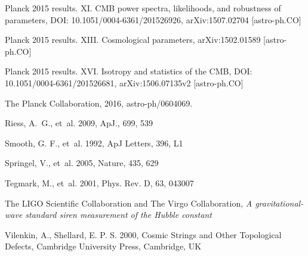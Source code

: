 \documentclass{rmaa}
\begin{document}
\begin{thebibliography}
Planck 2015 results. XI. CMB power spectra, likelihoods, and robustness of parameters,  	DOI: 10.1051/0004-6361/201526926, arXiv:1507.02704 [astro-ph.CO] 

Planck 2015 results. XIII. Cosmological parameters,  	arXiv:1502.01589 [astro-ph.CO]

 Planck 2015 results. XVI. Isotropy and statistics of the CMB, DOI:  	10.1051/0004-6361/201526681,  arXiv:1506.07135v2 [astro-ph.CO]
 
The Planck Collaboration, 2016, astro-ph/0604069. 
 
 Riess, A.~G., et~al. 2009, ApJ., 699, 539 

Smooth, G. F., et~al. 1992, ApJ Letters, 396, L1 
  
 Springel, V., et~al.  2005, Nature, 435, 629  

Tegmark, M., et~al. 2001, Phys. Rev. D, 63, 043007   

The LIGO Scientific Collaboration and The Virgo Collaboration, \textit{A gravitational-wave standard siren measurement of the Hubble constant}
 
 Vilenkin, A., Shellard, E. P. S. 2000, Cosmic Strings and Other Topological Defects,
Cambridge University Press,  Cambridge, UK 




\end{thebibliography}
\end{document}
